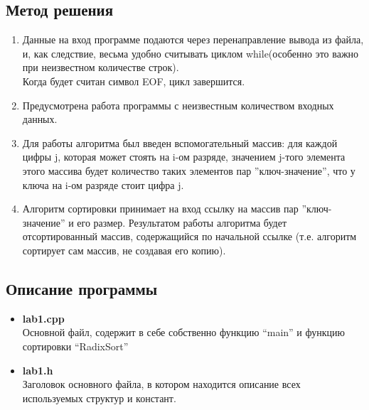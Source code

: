 \documentclass[12pt]{article}
\begin{document}
\subsection*{Метод решения}
    \begin{enumerate}
    
    \item  Данные на вход программе подаются через перенаправление вывода из файла, и, как следствие, весьма удобно считывать циклом while(особенно это важно при неизвестном количестве строк).\\ Когда будет считан символ EOF, цикл завершится.
    
    
    \item Предусмотрена работа программы с неизвестным количеством входных данных.

    
    \item Для работы алгоритма был введен вспомогательный массив: для каждой цифры j, которая может стоять на i-ом разряде, значением j-того элемента этого массива будет количество таких элементов пар ''ключ-значение'', что у ключа на i-ом разряде стоит цифра j.

    \item Алгоритм сортировки принимает на вход ссылку на массив пар ''ключ-значение'' и его размер. Результатом работы алгоритма будет отсортированный массив, содержащийся по начальной ссылке (т.е. алгоритм сортирует сам массив, не создавая его копию).
\end{enumerate}


\subsection*{Описание программы}

\begin{itemize}
    \item \textbf{lab1.cpp}\\ 
    Основной файл, содержит в себе собственно функцию ``main'' и функцию сортировки ``RadixSort''
    \item \textbf{lab1.h}\\
    Заголовок основного файла, в котором находится описание всех используемых структур и констант.
\end{itemize}
\end{document}
